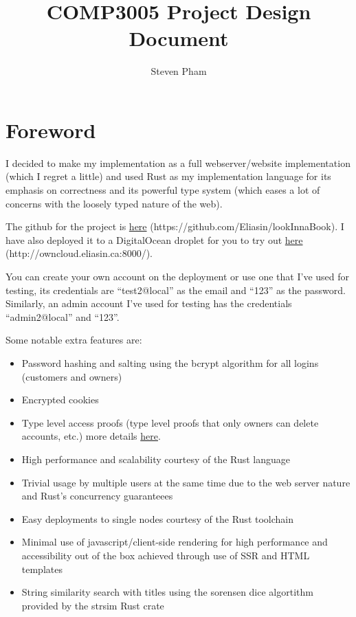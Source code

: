 \documentclass{article}
\title{COMP3005 Project Design Document}
\author{Steven Pham}
\begin{document}
\maketitle

\section{Foreword}
I decided to make my implementation as a full webserver/website implementation (which I regret a little) and used Rust as my implementation language for its emphasis on correctness and its powerful type system (which eases a lot of concerns with the loosely typed nature of the web).

The github for the project is \href{https://github.com/Eliasin/lookInnaBook}{here} (https://github.com/Eliasin/lookInnaBook). I have also deployed it to a DigitalOcean droplet for you to try out \href{http://owncloud.eliasin.ca:8000/}{here} (http://owncloud.eliasin.ca:8000/).

You can create your own account on the deployment or use one that I've used for testing, its credentials are ``test2@local'' as the email and ``123'' as the password. Similarly, an admin account I've used for testing has the credentials ``admin2@local'' and ``123''.

Some notable extra features are:
\begin{itemize}
  \item Password hashing and salting using the bcrypt algorithm for all logins (customers and owners)
  \item Encrypted cookies
  \item Type level access proofs (type level proofs that only owners can delete accounts, etc.) more details \href{https://rocket.rs/v0.4/guide/requests/#custom-guards}{here}.
  \item High performance and scalability courtesy of the Rust language
  \item Trivial usage by multiple users at the same time due to the web server nature and Rust's concurrency guaranteees
  \item Easy deployments to single nodes courtesy of the Rust toolchain
  \item Minimal use of javascript/client-side rendering for high performance and accessibility out of the box achieved through use of SSR and HTML templates
  \item String similarity search with titles using the sorensen dice algortithm provided by the strsim Rust crate
\end{itemize}
\end{document}
